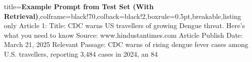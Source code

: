 \documentclass{article} %
\begin{document}
\begin{tcblisting}{title={\textbf{Example Prompt from Test Set (With Retrieval)}},colframe=black!70,colback=black!2,boxrule=0.5pt,breakable,listing only}
Article 1:
Title: CDC warns US travellers of growing Dengue threat. Here's what you need to know
Source: www.hindustantimes.com
Article Publish Date: March 21, 2025
Relevant Passage: CDC warns of rising dengue fever cases among U.S. travellers, reporting 3,484 cases in 2024, an 84%


\end{tcblisting}
\end{document}

